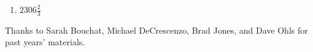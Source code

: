 \documentclass[11pt]{article}
\begin{document}
\begin{enumerate}
\vspace{.5cm}

\item $2306\frac{2}{3}$

\vspace{.5cm}


\end{enumerate}

\vfill
\begin{center}
\small{Thanks to Sarah Bouchat, Michael DeCrescenzo, Brad Jones, and Dave Ohls for past years' materials.}
\end{center}
\end{document}
